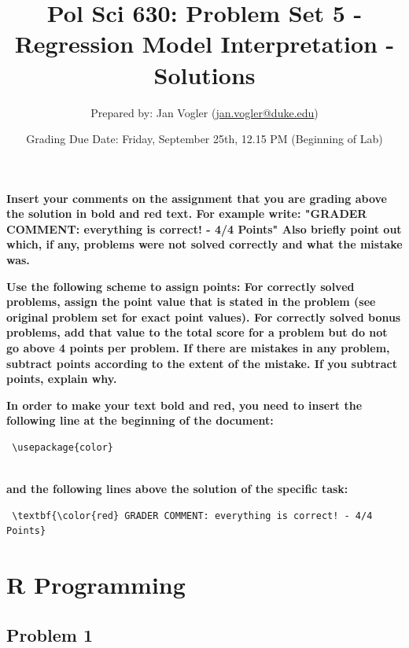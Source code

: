 \documentclass[12pt,letter]{article}\usepackage[]{graphicx}\usepackage[]{color}
\begin{document}
\title{Pol Sci 630: Problem Set 5 - Regression Model Interpretation - Solutions}

\author{Prepared by: Jan Vogler (\href{mailto:jan.vogler@duke.edu}{jan.vogler@duke.edu})}

\date{Grading Due Date: Friday, September 25th, 12.15 PM (Beginning of Lab)}
 
\maketitle



\textbf{\color{red} Insert your comments on the assignment that you are grading above the solution in bold and red text. For example write: "GRADER COMMENT: everything is correct! - 4/4 Points" Also briefly point out which, if any, problems were not solved correctly and what the mistake was.}

\bigskip

\textbf{Use the following scheme to assign points: For correctly solved problems, assign the point value that is stated in the problem (see original problem set for exact point values). For correctly solved bonus problems, add that value to the total score for a problem but do not go above 4 points per problem. If there are mistakes in any problem, subtract points according to the extent of the mistake. If you subtract points, explain why.}

\bigskip

\textbf{In order to make your text bold and red, you need to insert the following line at the beginning of the document:}

\begin{verbatim} \usepackage{color} \end{verbatim}

\\ \textbf{and the following lines above the solution of the specific task:}

\begin{verbatim} \textbf{\color{red} GRADER COMMENT: everything is correct! - 4/4 Points} \end{verbatim}



\pagebreak

\section*{R Programming}

\subsection*{Problem 1}
\end{document}
